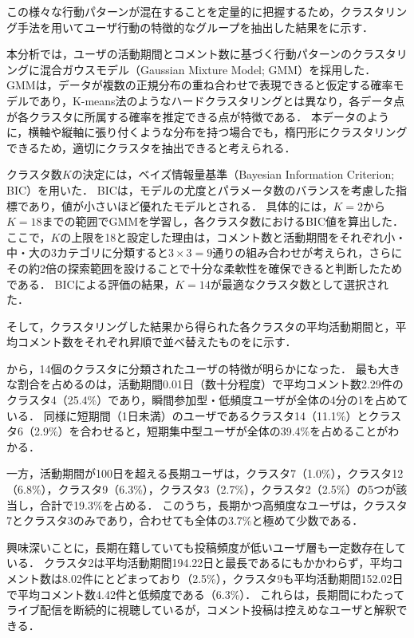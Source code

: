 この様々な行動パターンが混在することを定量的に把握するため，クラスタリング手法を用いてユーザ行動の特徴的なグループを抽出した結果をに示す．




本分析では，ユーザの活動期間とコメント数に基づく行動パターンのクラスタリングに混合ガウスモデル\cite{lin2019deep}（Gaussian Mixture Model; GMM）を採用した．
GMMは，データが複数の正規分布の重ね合わせで表現できると仮定する確率モデルであり，K-means法のようなハードクラスタリングとは異なり，各データ点が各クラスタに所属する確率を推定できる点が特徴である．
本データのように，横軸や縦軸に張り付くような分布を持つ場合でも，楕円形にクラスタリングできるため，適切にクラスタを抽出できると考えられる\cite{chen2024optimal}．

クラスタ数$K$の決定には，ベイズ情報量基準（Bayesian Information Criterion; BIC）を用いた．
BICは，モデルの尤度とパラメータ数のバランスを考慮した指標であり，値が小さいほど優れたモデルとされる．
具体的には，$K=2$から$K=18$までの範囲でGMMを学習し，各クラスタ数におけるBIC値を算出した．
ここで，$K$の上限を18と設定した理由は，コメント数と活動期間をそれぞれ小・中・大の3カテゴリに分類すると$3 \times 3 = 9$通りの組み合わせが考えられ，さらにその約2倍の探索範囲を設けることで十分な柔軟性を確保できると判断したためである．
BICによる評価の結果，$K=14$が最適なクラスタ数として選択された．

そして，クラスタリングした結果から得られた各クラスタの平均活動期間と，平均コメント数をそれぞれ昇順で並べ替えたものをに示す．

から，14個のクラスタに分類されたユーザの特徴が明らかになった．
最も大きな割合を占めるのは，活動期間0.01日（数十分程度）で平均コメント数2.29件のクラスタ4（25.4\%）であり，瞬間参加型・低頻度ユーザが全体の4分の1を占めている．
同様に短期間（1日未満）のユーザであるクラスタ14（11.1\%）とクラスタ6（2.9\%）を合わせると，短期集中型ユーザが全体の39.4\%を占めることがわかる．

一方，活動期間が100日を超える長期ユーザは，クラスタ7（1.0\%），クラスタ12（6.8\%），クラスタ9（6.3\%），クラスタ3（2.7\%），クラスタ2（2.5\%）の5つが該当し，合計で19.3\%を占める．
このうち，長期かつ高頻度なユーザは，クラスタ7とクラスタ3のみであり，合わせても全体の3.7\%と極めて少数である．

興味深いことに，長期在籍していても投稿頻度が低いユーザ層も一定数存在している．
クラスタ2は平均活動期間194.22日と最長であるにもかかわらず，平均コメント数は8.02件にとどまっており（2.5\%），クラスタ9も平均活動期間152.02日で平均コメント数4.42件と低頻度である（6.3\%）．
これらは，長期間にわたってライブ配信を断続的に視聴しているが，コメント投稿は控えめなユーザと解釈できる．

